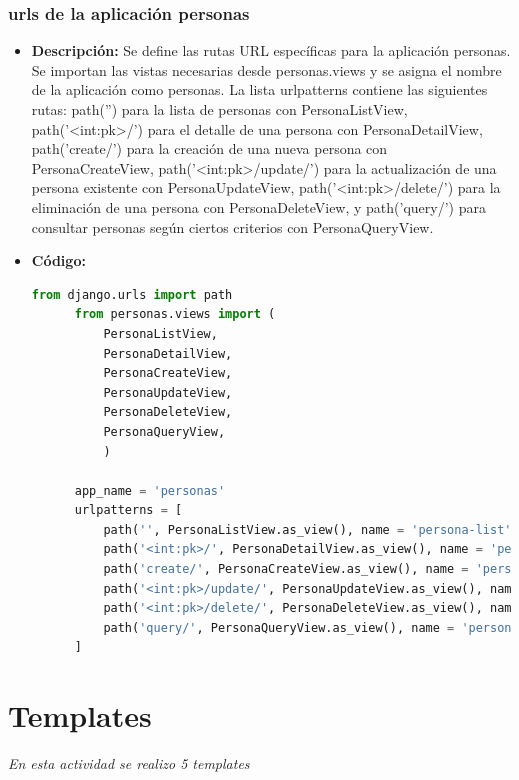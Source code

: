 \documentclass{article}
\begin{document}
  
  \subsubsection{urls de la aplicación personas}
  \begin{itemize}
    \item \textbf{Descripción: }Se define las rutas URL específicas para la aplicación personas. Se importan las vistas 
    necesarias desde personas.views y se asigna el nombre de la aplicación como personas. La lista urlpatterns contiene 
    las siguientes rutas: path('') para la lista de personas con PersonaListView, path('<int:pk>/') para el detalle de 
    una persona con PersonaDetailView, path('create/') para la creación de una nueva persona con PersonaCreateView, 
    path('<int:pk>/update/') para la actualización de una persona existente con PersonaUpdateView, path('<int:pk>/delete/') 
    para la eliminación de una persona con PersonaDeleteView, y path('query/') para consultar personas según ciertos criterios 
    con PersonaQueryView.
    \item \textbf{Código: }
    \begin{lstlisting}[language=Python]
      from django.urls import path
      from personas.views import (
          PersonaListView,
          PersonaDetailView,
          PersonaCreateView,
          PersonaUpdateView,
          PersonaDeleteView,
          PersonaQueryView,
          )

      app_name = 'personas'
      urlpatterns = [
          path('', PersonaListView.as_view(), name = 'persona-list'),
          path('<int:pk>/', PersonaDetailView.as_view(), name = 'persona-detail'),
          path('create/', PersonaCreateView.as_view(), name = 'persona-create'),
          path('<int:pk>/update/', PersonaUpdateView.as_view(), name = 'persona-update'),
          path('<int:pk>/delete/', PersonaDeleteView.as_view(), name = 'persona-delete'),
          path('query/', PersonaQueryView.as_view(), name = 'persona-query'),
      ]
    \end{lstlisting}   
  \end{itemize}


  \section{Templates}
  \textit{En esta actividad se realizo 5 templates}
  
\end{document}
